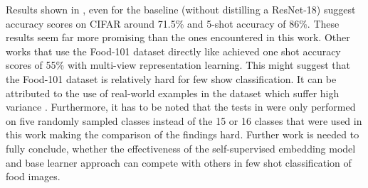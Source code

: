 Results shown in \cite{tian_rethinking_2020}, even for the baseline (without distilling a ResNet-18) suggest accuracy 
scores on CIFAR around 71.5\% and 5-shot accuracy of 86\%. These results seem far more promising than the 
ones encountered in this work. Other works that use the Food-101 dataset directly like \cite{jiang_few-shot_2020} achieved
one shot accuracy scores of 55\% with multi-view representation learning. This might suggest that the Food-101 
dataset is relatively hard for few show classification. It can be attributed to the use of real-world examples in the 
dataset which suffer high variance \cite{fleet_food-101_2014}.
Furthermore, it has to be noted that the tests in \cite{jiang_few-shot_2020} were only performed on 
five randomly sampled classes \cite{jiang_few-shot_2020}
instead of the 15 or 16 classes that were used in this work making the comparison of the findings hard.
Further work is needed to fully conclude, whether the effectiveness of the self-supervised embedding model
and base learner approach can compete with others in few shot classification of food images.
